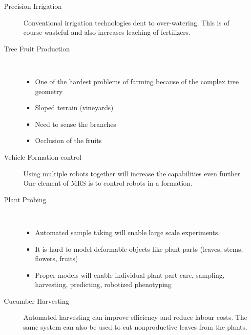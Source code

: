 \begin{description}
\begin{itemize}
    \end{itemize}
    \item[Precision Irrigation] Conventional irrigation technologies dent to over-watering. 
    This is of course wasteful and also increases leaching of fertilizers.
    \item[Tree Fruit Production] \
    \begin{itemize}
        \item One of the hardest problems of farming because of the complex tree geometry
        \item Sloped terrain (vineyards)
        \item Need to sense the branches
        \item Occlusion of the fruits
    \end{itemize}
    \item[Vehicle Formation control] Using multiple robots together will increase the capabilities even further. One element of MRS is to control robots in a formation.
    \item[Plant Probing] \
    \begin{itemize}
        \item Automated sample taking will enable large scale experiments.
        \item It is hard to model deformable objects like plant parts (leaves, stems, flowers, fruits)
        \item Proper models will enable individual plant part care, sampling, harvesting, predicting, robotized phenotyping
    \end{itemize} 
    \item[Cucumber Harvesting] Automated harvesting can improve efficiency and reduce labour costs. The same system can also be used to cut nonproductive leaves from the plants.

\end{description} 
